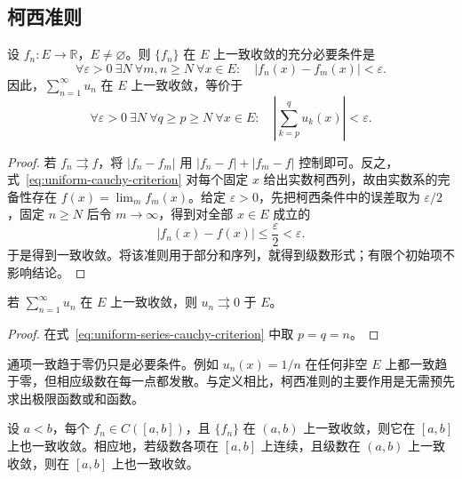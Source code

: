 \subsection{柯西准则}
\label{subsec:cauchy-criterion-for-uniform-convergence}

\begin{theorem}[一致收敛的柯西准则]
\label{thm:uniform-convergence-cauchy-criterion}
设 $f_n:E\to\mathbb R$，$E\neq\varnothing$。则 $\{f_n\}$ 在 $E$ 上一致收敛的充分必要条件是
\begin{equation}
    \forall\varepsilon>0\ \exists N\ \forall m,n\geq N
    \ \forall x\in E:\quad |f_n(x)-f_m(x)|<\varepsilon.
    \label{eq:uniform-cauchy-criterion}
\end{equation}
因此，$\sum_{n=1}^\infty u_n$ 在 $E$ 上一致收敛，等价于
\begin{equation}
    \forall\varepsilon>0\ \exists N\ \forall q\geq p\geq N
    \ \forall x\in E:\quad
    \left|\sum_{k=p}^q u_k(x)\right|<\varepsilon.
    \label{eq:uniform-series-cauchy-criterion}
\end{equation}
\end{theorem}

\begin{proof}
若 $f_n\rightrightarrows f$，将 $|f_n-f_m|$ 用 $|f_n-f|+|f_m-f|$ 控制即可。反之，式~\eqref{eq:uniform-cauchy-criterion} 对每个固定 $x$ 给出实数柯西列，故由实数系的完备性存在 $f(x)=\lim_m f_m(x)$。给定 $\varepsilon>0$，先把柯西条件中的误差取为 $\varepsilon/2$，固定 $n\geq N$ 后令 $m\to\infty$，得到对全部 $x\in E$ 成立的
\[
    |f_n(x)-f(x)|\leq\frac\varepsilon2<\varepsilon.
\]
于是得到一致收敛。将该准则用于部分和序列，就得到级数形式；有限个初始项不影响结论。
\end{proof}

\begin{corollary}
\label{cor:uniform-series-term-necessary-condition}
若 $\sum_{n=1}^\infty u_n$ 在 $E$ 上一致收敛，则 $u_n\rightrightarrows0$ 于 $E$。
\end{corollary}

\begin{proof}
在式~\eqref{eq:uniform-series-cauchy-criterion} 中取 $p=q=n$。
\end{proof}

通项一致趋于零仍只是必要条件。例如 $u_n(x)=1/n$ 在任何非空 $E$ 上都一致趋于零，但相应级数在每一点都发散。与定义相比，柯西准则的主要作用是无需预先求出极限函数或和函数。

\begin{proposition}[补入端点]
\label{prop:uniform-convergence-extension-to-endpoints}
设 $a<b$，每个 $f_n\in C([a,b])$，且 $\{f_n\}$ 在 $(a,b)$ 上一致收敛，则它在 $[a,b]$ 上也一致收敛。相应地，若级数各项在 $[a,b]$ 上连续，且级数在 $(a,b)$ 上一致收敛，则在 $[a,b]$ 上也一致收敛。
\end{proposition}

